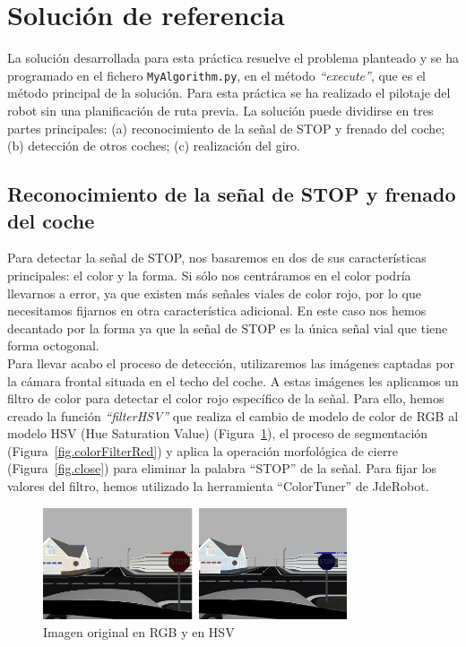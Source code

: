 \section{Solución de referencia}
La solución desarrollada para esta práctica resuelve el problema planteado y se ha programado en el fichero \texttt{MyAlgorithm.py}, en el método \textit{``execute''}, que es el método principal de la solución. Para esta práctica se ha realizado el pilotaje del robot sin una planificación de ruta previa. La solución puede dividirse en tres partes principales: (a) reconocimiento de la señal de STOP y frenado del coche; (b) detección de otros coches; (c) realización del giro. 

\subsection{Reconocimiento de la señal de STOP y frenado del coche}
Para detectar la señal de STOP, nos basaremos en dos de sus características principales: el color y la forma. Si sólo nos centráramos en el color podría llevarnos a error, ya que existen más señales viales de color rojo, por lo que necesitamos fijarnos en otra característica adicional. En este caso nos hemos decantado por la forma ya que la señal de STOP es la única señal vial que tiene forma octogonal. \\

Para llevar acabo el proceso de detección, utilizaremos las imágenes captadas por la cámara frontal situada en el techo del coche. A estas imágenes les aplicamos un filtro de color para detectar el color rojo específico de la señal. Para ello, hemos creado la función \textit{``filterHSV''} que realiza el cambio de modelo de color de RGB al modelo HSV (Hue Saturation Value) (Figura~\ref{fig.imgRGByHSV}), el proceso de segmentación (Figura~\ref{fig.colorFilterRed}) y aplica la operación morfológica de cierre (Figura~\ref{fig.close}) para eliminar la palabra ``STOP'' de la señal. Para fijar los valores del filtro, hemos utilizado la herramienta ``ColorTuner'' de JdeRobot.\\

\begin{figure}[H]
  \begin{center}
    \includegraphics[width=0.8\textwidth]{figures/Stop/imgRGByHSV.jpg}
		\caption{Imagen original en RGB y en HSV}
		\label{fig.imgRGByHSV}
		\end{center}
\end{figure}

